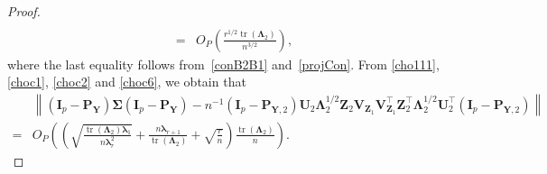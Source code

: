\documentclass[10pt]{book}
\theoremstyle{definition}
\DeclareMathOperator{\mytr}{tr}
\newcommand{\bZ}{\mathbf{Z}}
\newcommand{\bP}{\mathbf{P}}
\newcommand{\bY}{\mathbf{Y}}
\newcommand{\bI}{\mathbf{I}}
\newcommand{\bU}{\mathbf{U}}
\newcommand{\bV}{\mathbf{V}}
\newcommand{\bfsym}[1]{\ensuremath{\boldsymbol{#1}}}
\def\blambda {\bfsym {\lambda}}
\def\bLambda {\bfsym {\Lambda}}
\def\bSigma {\bfsym {\Sigma}}
\begin{document}
\begin{proof}
\begin{equation}
\begin{split}
                  \\
                  =&
                  O_P\left(\frac{r^{1/2}\mytr(\bLambda_2)}{n^{3/2}}\right),
     \end{split}
 \end{equation}
where the last equality follows from~\eqref{conB2B1} and~\eqref{projCon}.
From \eqref{cho111}, \eqref{choc1}, \eqref{choc2} and \eqref{choc6}, we obtain that
         \begin{equation*}
             \begin{split}
             &\left\|
             (\bI_p -\bP_\bY)\bSigma (\bI_p- \bP_{\bY})
             -
             n^{-1}
             (\bI_p -\bP_{\bY,2})
              \bU_2 \bLambda_2^{1/2} \bZ_2 \bV_{\bZ_1} \bV_{\bZ_1}^\top \bZ_2^\top \bLambda_2^{1/2} \bU_2^\top
             (\bI_p- \bP_{\bY,2})
             \right\|
             \\
             =&
             O_P\left(
                 \left(
                     \sqrt{\frac{\mytr(\bLambda_2)\blambda_1}{n\blambda_r^2}}  
                     +\frac{n\blambda_{r+1}}{\mytr(\bLambda_2)}
                     +\sqrt{\frac{r}{n}}
                 \right)
             \frac{\mytr(\bLambda_2)}{n}\right).
             \end{split}
         \end{equation*}


\end{proof}
\end{document}
